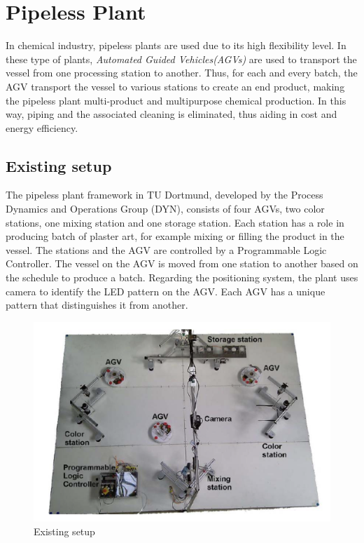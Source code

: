 \section{Pipeless Plant} %

In chemical industry, pipeless plants are used due to its high flexibility level. In these type of plants, \textit{Automated Guided Vehicles(AGVs)} are used to transport the vessel from one processing station to another. Thus, for each and every batch, the AGV transport the vessel to various stations to create an end product, making the pipeless plant multi-product and multipurpose chemical production. In this way, piping and the associated cleaning is eliminated, thus aiding in cost and energy efficiency.

\subsection{Existing setup}
 
 The pipeless plant framework in TU Dortmund, developed by the Process Dynamics and Operations Group (DYN), consists of four AGVs, two color stations, one mixing station and one storage station. Each station has a role in producing batch of plaster art, for example mixing or filling the product in the vessel. The stations and the AGV are controlled by a Programmable Logic Controller. The vessel on the AGV is moved from one station to another based on the schedule to produce a batch. Regarding the positioning system, the plant uses camera to identify the LED pattern on the AGV. Each AGV has a unique pattern that distinguishes it from another.


\begin{figure}[!htbp]
	\centering
	\includegraphics[width=14cm]{Pictures/Plant.png}
	\caption{Existing setup}
	\label{Pipeless plant}
\end{figure}


